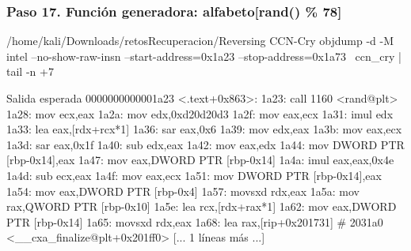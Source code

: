 \documentclass[11pt,a4paper]{article}
\begin{document}
\subsubsection*{Paso 17. Función generadora: alfabeto[rand() \% 78]}
\begin{comando}{/home/kali/Downloads/retosRecuperacion/Reversing CCN-Cry}
objdump -d -M intel --no-show-raw-insn --start-address=0x1a23 --stop-address=0x1a73 \
  ccn_cry | tail -n +7
\end{comando}
\begin{salidan}{Salida esperada}
0000000000001a23 <.text+0x863>:
    1a23:       call   1160 <rand@plt>
    1a28:       mov    ecx,eax
    1a2a:       mov    edx,0xd20d20d3
    1a2f:       mov    eax,ecx
    1a31:       imul   edx
    1a33:       lea    eax,[rdx+rcx*1]
    1a36:       sar    eax,0x6
    1a39:       mov    edx,eax
    1a3b:       mov    eax,ecx
    1a3d:       sar    eax,0x1f
    1a40:       sub    edx,eax
    1a42:       mov    eax,edx
    1a44:       mov    DWORD PTR [rbp-0x14],eax
    1a47:       mov    eax,DWORD PTR [rbp-0x14]
    1a4a:       imul   eax,eax,0x4e
    1a4d:       sub    ecx,eax
    1a4f:       mov    eax,ecx
    1a51:       mov    DWORD PTR [rbp-0x14],eax
    1a54:       mov    eax,DWORD PTR [rbp-0x4]
    1a57:       movsxd rdx,eax
    1a5a:       mov    rax,QWORD PTR [rbp-0x10]
    1a5e:       lea    rcx,[rdx+rax*1]
    1a62:       mov    eax,DWORD PTR [rbp-0x14]
    1a65:       movsxd rdx,eax
    1a68:       lea    rax,[rip+0x201731]        # 2031a0 <__cxa_finalize@plt+0x201ff0>
[... 1 líneas más ...]
\end{salidan}
\end{document}
